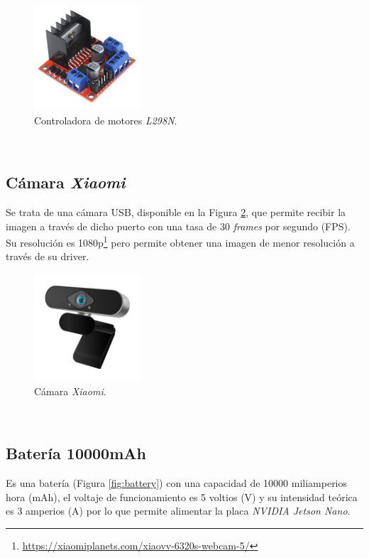 \begin{figure} [h!]
	\begin{center}
		\includegraphics[width=4cm]{figs/l298n}
	\end{center}
	\caption{Controladora de motores \textit{L298N}.}
	\label{fig:l298n}
\end{figure}\

\subsection{Cámara \textit{Xiaomi}}
\label{subsection:xiaomicamera}
Se trata de una cámara USB, disponible en la Figura \ref{fig:xiaomicamera}, que permite recibir la imagen a través de dicho puerto con una tasa de 30 \textit{frames} por segundo (FPS). Su resolución es 1080p\footnote{\url{https://xiaomiplanets.com/xiaovv-6320s-webcam-5/}} pero permite obtener una imagen de menor resolución a través de su driver.\\

\begin{figure} [h!]
	\begin{center}
		\includegraphics[width=4cm]{figs/camera}
	\end{center}
	\caption{Cámara \textit{Xiaomi}.}
	\label{fig:xiaomicamera}
\end{figure}\

\subsection{Batería 10000mAh}
\label{subsection:battery}
Es una batería (Figura \ref{fig:battery}) con una capacidad de 10000 miliamperios hora (mAh), el voltaje de funcionamiento es 5 voltios (V) y su intensidad teórica es 3 amperios (A) por lo que permite alimentar la placa \textit{NVIDIA Jetson Nano}.\\

